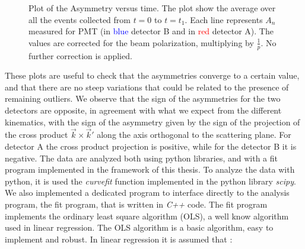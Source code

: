 \begin{figure}[!hbtp]
\centering
{}
\caption{Plot of the Asymmetry versus time. The plot show the average over all the events collected from $t = 0$ to $t = t_{1}$. Each line represents $A_{n}$ measured for  PMT (in \textcolor{blue}{blue} detector B and in \textcolor{red}{red} detector A). The values are corrected for the beam polarization, multiplying by $\frac{1}{p}$. No further correction is applied.}
\label{fig:AsymOverTime}
\end{figure}

These plots are useful to check that the asymmetries converge to a certain value, and that there are no steep variations that could be related to the presence of remaining outliers. We observe that the sign of the asymmetries for the two detectors are opposite, in agreement with what we expect from the different kinematics, with the sign of the asymmetry given by the sign of the projection of the cross product $\vec{k} \times \vec{k}'$ along the axis orthogonal to the scattering plane. For detector A the cross product projection is positive, while for the detector B it is negative. The data are analyzed both using python libraries, and with a fit program implemented in the framework of this thesis. To analyze the data with python, it is used the \textit{curvefit} function implemented in the python library \textit{scipy}. We also implemented a dedicated program to interface directly to the analysis program, the fit program, that is written in \textit{C++} code. The fit program implements the ordinary least square algorithm (OLS), a well know algorithm used in linear regression. The OLS algorithm is a basic algorithm, easy to implement and robust. In linear regression it is assumed that :

